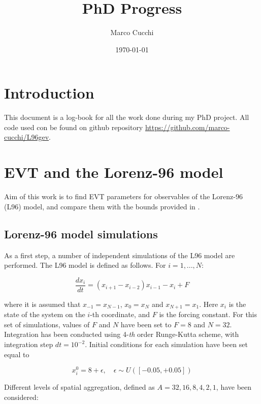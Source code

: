 \documentclass{article}
\title{PhD Progress}
\author{Marco Cucchi}
\date{\today}
\begin{document}
\maketitle
\tableofcontents
\newpage

\section{Introduction}

This document is a log-book for all the work done during my PhD project.
All code used con be found on github repository \url{https://github.com/marco-cucchi/L96gev}.

\section{EVT and the Lorenz-96 model}

Aim of this work is to find EVT parameters for observables of the Lorenz-96 (L96) model, and compare them with the bounds provided in \cite{LucariniExtremesBook}.

\subsection{Lorenz-96 model simulations} \label{gev_sim}

As a first step, a number of independent simulations of the L96 model are performed.
The L96 model is defined as follows. For $i=1,...,N$:

\begin{equation}
\frac{dx_i}{dt} = (x_{i+1}-x_{i-2})x_{i-1} - x_i + F
\end{equation}

where it is assumed that $x_{-1}=x_{N-1}$, $x_0 = x_N$ and $x_{N+1}=x_1$. Here $x_i$ is the state of the system on the $i$-th coordinate, and $F$ is the forcing constant.
For this set of simulations, values of $F$ and $N$ have been set to $F=8$ and $N=32$.\\
Integration has been conducted using 4-\textit{th} order Runge-Kutta scheme, with integration step $dt=10^{-2}$. Initial conditions for each simulation have been set equal to

\begin{equation}
x_i^0 = 8 + \epsilon, \quad \epsilon \sim U([-0.05,+0.05])
\end{equation}

Different levels of spatial aggregation, defined as $A=32,16,8,4,2,1$, have been considered:
\end{document}
